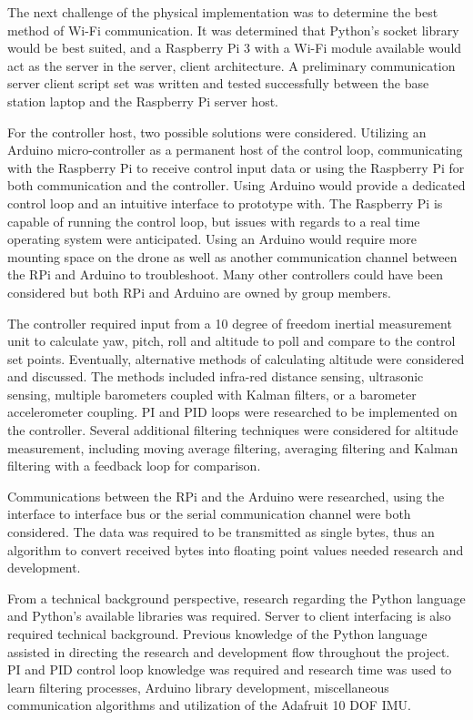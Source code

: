The next challenge of the physical implementation was to determine the best method of Wi-Fi communication. It was determined that Python's socket library would be best suited, and a Raspberry Pi 3 with a Wi-Fi module available would act as the server in the server, client architecture. A preliminary communication server client script set was written and tested successfully between the base station laptop and the Raspberry Pi server host. 

For the controller host, two possible solutions were considered. Utilizing an Arduino micro-controller as a permanent host of the control loop, communicating with the Raspberry Pi to receive control input data or using the Raspberry Pi for both communication and the controller. Using Arduino would provide a dedicated control loop and an intuitive interface to prototype with. The Raspberry Pi is capable of running the control loop, but issues with regards to a real time operating system were anticipated. Using an Arduino would require more mounting space on the drone as well as another communication channel between the RPi and Arduino to troubleshoot. Many other controllers could have been considered but both RPi and Arduino are owned by group members.

The controller required input from a 10 degree of freedom inertial measurement unit to calculate yaw, pitch, roll and altitude to poll and compare to the control set points. Eventually, alternative methods of calculating altitude were considered and discussed. The methods included infra-red distance sensing, ultrasonic sensing, multiple barometers coupled with Kalman filters, or a barometer accelerometer coupling. PI and PID loops were researched to be implemented on the controller. Several additional filtering techniques were considered for altitude measurement, including moving average filtering, averaging filtering and Kalman filtering with a feedback loop for comparison.

Communications between the RPi and the Arduino were researched, using the interface to interface bus or the serial communication channel were both considered. The data was required to be transmitted as single bytes, thus an algorithm to convert received bytes into floating point values needed research and development.

From a technical background perspective, research regarding the Python language and Python's available libraries was required. Server to client interfacing is also required technical background. Previous knowledge of the Python language assisted in directing the research and development flow throughout the project. PI and PID control loop knowledge was required and research time was used to learn filtering processes, Arduino library development, miscellaneous communication algorithms and utilization of the Adafruit 10 DOF IMU.



